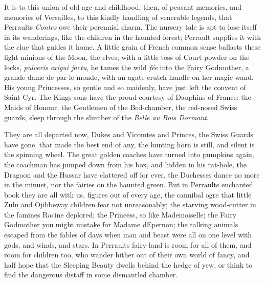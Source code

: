 \documentclass[14pt,a4paper]{memoir}
\begin{document}
{It is to this union of old age and childhood, then, of peasant memories,
and memories of Versailles, to this kindly handling of venerable
legends, that Perrault\textquotesingle s \emph{Contes} owe their
perennial charm. The nursery tale is apt to lose itself in its
wanderings, like the children in the haunted forest; Perrault supplies
it with the clue that guides it home. A little grain of French common
sense ballasts these light minions of the Moon, the elves; with a little
toss of Court powder on the locks, \emph{pulveris exigui jactu}, he
tames the wild \emph{fée} into the Fairy Godmother, a grande dame de par
le monde, with an agate crutch-handle on her magic wand.
\textquotesingle His young Princesses, so gentle and so maidenly, have
just left the convent of Saint Cyr. The King\textquotesingle s sons have
the proud courtesy of Dauphins of France: the Maids of Honour, the
Gentlemen of the Bed-chamber, the red-nosed Swiss guards, sleep through
the slumber of the \emph{Belle au Bois
Dormant}.\textquotesingle{}

They are all departed now, Dukes and Vicomtes and Princes, the Swiss
Guards have gone, that made the best end of any, the hunting horn is
still, and silent is the spinning wheel. The great golden coaches have
turned into pumpkins again, the coachman has jumped down from his box,
and hidden in his rat-hole, the Dragoon and the Hussar have clattered
off for ever, the Duchesses dance no more in the minuet, nor the fairies
on the haunted green. But in Perrault\textquotesingle s enchanted book
they are all with us, figures out of every age, the cannibal ogre that
little Zulu and Ojibbeway children fear not unreasonably; the starving
wood-cutter in the famines Racine deplored; the Princess, so like
Mademoiselle; the Fairy Godmother you might mistake for Madame
d\textquotesingle Epernon; the talking animals escaped from the fables
of days when man and beast were all on one level with gods, and winds,
and stars. In Perrault\textquotesingle s fairy-land is room for all of
them, and room for children too, who wander hither out of their own
world of fancy, and half hope that the Sleeping Beauty dwells behind the
hedge of yew, or think to find the dangerous distaff in some dismantled
chamber.

}
\end{document}
